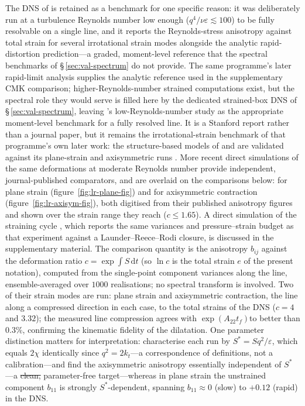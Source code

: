 \documentclass[lineno]{JFM-FLM_Au}
\providecommand{\DIFadd}[1]{{\protect\color{blue}\uwave{#1}}} %
\providecommand{\DIFdel}[1]{{\protect\color{red}\sout{#1}}} %
\providecommand{\DIFaddbegin}{} %
\providecommand{\DIFaddend}{} %
\providecommand{\DIFdelbegin}{} %
\providecommand{\DIFdelend}{} %
\begin{document}
The DNS of \citet{LeeReynolds1985} is retained as a benchmark for one
specific reason: it was deliberately run at a turbulence Reynolds number
low enough ($q^4/\nu\varepsilon\lesssim100$) to be fully resolvable on a
single line, and it reports the Reynolds-stress anisotropy against total
strain for several irrotational strain modes alongside the analytic
rapid-distortion prediction---a graded, moment-level reference that the
spectral benchmarks of \S\,\ref{sec:val-spectrum} do not provide. The
same programme's later rapid-limit analysis
\citep{LeePiomelliReynolds1986} supplies the analytic reference used in
the supplementary CMK comparison; higher-Reynolds-number strained
computations exist, but the spectral role they would serve is filled
here by the dedicated strained-box DNS of \S\,\ref{sec:val-spectrum},
leaving \citeauthor{LeeReynolds1985}'s low-Reynolds-number study as the
appropriate moment-level benchmark for a fully resolved line. It is a
Stanford report rather than a journal paper, but it remains the
irrotational-strain benchmark of that programme's own later work: the
structure-based models of \citet{ReynoldsKassinos1995} and
\citet{KassinosReynoldsRogers2001} are validated against its plane-strain
and axisymmetric runs \citep{KassinosReynolds1998}. More recent direct
simulations of the same deformations at moderate Reynolds number provide
independent, journal-published comparators, and are overlaid on the
comparisons below: \citet{ZusiPerot2013} for plane strain
(figure~\ref{fig:lr-plane-fig}) and \citet{ZusiPerot2014} for
axisymmetric contraction (figure~\ref{fig:lr-axisym-fig}), both digitised
from their published anisotropy figures and shown over the strain range
they reach ($c\le1.65$). A direct simulation of the
\citeauthor{ChenMeneveauKatz2006} straining cycle
\citep{GualtieriMeneveau2010}, which reports the same variances and
pressure--strain budget as that experiment against a
Launder--Reece--Rodi closure, is discussed in the supplementary material.
The
comparison quantity is the anisotropy $b_{ij}$ against the deformation
ratio $c=\exp\int S\,\mathrm{d}t$ (so $\ln c$ is the total strain $e$ of
the present notation), computed from the single-point component
variances along the line, ensemble-averaged over $1000$ realisations;
no spectral transform is involved. Two of their strain modes are run:
plane strain and axisymmetric contraction, the line along a compressed
direction in each case, to the total strains of the DNS ($c=4$ and
$3.32$); the measured line compression agrees with $\exp(A_{22}t_f)$\DIFaddbegin \DIFadd{, $t_f$ the total straining time, }\DIFaddend to better than $0.3\%$, confirming the kinematic
fidelity of the dilatation. One parameter distinction matters for
interpretation: \citeauthor{LeeReynolds1985} characterise each run by
$S^{*}=Sq^2/\varepsilon$, which equals $2\chi$ identically since
$q^2=2k_t$---a correspondence of definitions, not a calibration---and
find the axisymmetric anisotropy
essentially independent of $S^{*}$---a \DIFdelbegin \DIFdel{clean, }\DIFdelend parameter-free target---whereas in plane strain the unstrained component $b_{11}$ is
strongly $S^{*}$-dependent, spanning $b_{11}\approx0$ (slow) to
$+0.12$ (rapid) in the DNS.
\end{document}
